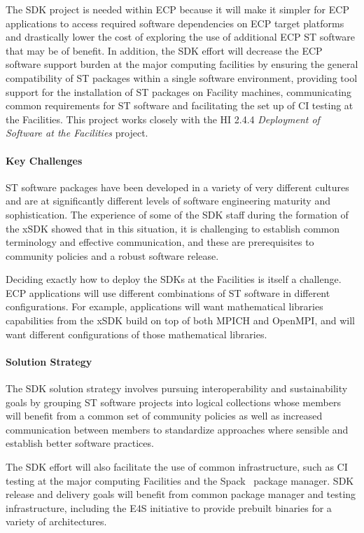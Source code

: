 The SDK project is needed within ECP because it will make it simpler for ECP applications to access required software dependencies on ECP target platforms and drastically lower the cost of exploring the use of additional ECP ST software that may be of benefit. In addition, the SDK effort will decrease the ECP software support burden at the major computing facilities by ensuring the general compatibility of ST packages within a single software environment, providing tool support for the installation of ST packages on Facility machines, communicating common requirements for ST software and facilitating the set up of CI testing at the Facilities. This project works closely with the HI 2.4.4 \textit{Deployment of Software at the Facilities} project.

\paragraph{Key  Challenges}
ST software packages have been developed in a variety of very different cultures and are at significantly different levels of software engineering maturity and sophistication. The experience of some of the SDK staff during the formation of the xSDK showed that in this situation, it is challenging to establish common terminology and effective communication, and these are prerequisites to community policies and a robust software release.

Deciding exactly how to deploy the SDKs at the Facilities is itself a challenge. ECP applications will use different combinations of ST software in different configurations. For example, applications will want mathematical libraries capabilities from the xSDK build on top of both MPICH and OpenMPI, and will want different configurations of those mathematical libraries.

\paragraph{Solution Strategy}
The SDK solution strategy involves pursuing interoperability and sustainability goals by grouping ST software projects into logical collections whose members will benefit from a common set of community policies as well as increased communication between members to standardize approaches where sensible and establish better software practices. 

The SDK effort will also facilitate the use of common infrastructure, such as CI testing at the major computing Facilities and the Spack~\cite{gamblin+:sc15} package manager. SDK release and delivery goals will benefit from common package manager and testing infrastructure, including the E4S initiative to provide prebuilt binaries for a variety of architectures.

